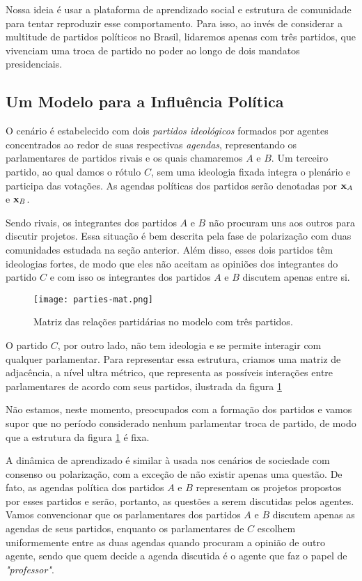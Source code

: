 Nossa ideia é usar a plataforma de aprendizado social e estrutura de comunidade para tentar reproduzir esse comportamento.
Para isso, ao invés de considerar a multitude de partidos políticos no Brasil, lidaremos apenas com três partidos, que vivenciam uma troca de partido no poder ao longo de dois mandatos presidenciais.

\subsection{Um Modelo para a Influência Política}

O cenário é estabelecido com dois \emph{partidos ideológicos} formados por agentes concentrados ao redor de suas respectivas \emph{agendas}, representando os parlamentares de partidos rivais e os quais chamaremos  $A$ e $B$.
Um terceiro partido, ao qual damos o rótulo $C$, sem uma ideologia fixada integra o plenário e participa das votações.
As agendas políticas dos partidos serão denotadas por $\mathbf{x}_A$ e $\mathbf{x}_B$.

Sendo rivais, os integrantes dos partidos $A$ e $B$ não procuram uns aos outros para discutir projetos.
Essa situação é bem descrita pela fase de polarização com duas comunidades estudada na seção anterior.
Além disso, esses dois partidos têm ideologias fortes, de modo que eles não aceitam as opiniões dos integrantes do partido $C$ e com isso os integrantes dos partidos $A$ e $B$ discutem apenas entre si.
\begin{figure}[t!]\label{fig:parties-mat}
    \centering
    \texttt{[image: parties-mat.png]}
    \caption{Matriz das relações partidárias no modelo com três partidos.}
\end{figure}
O partido $C$, por outro lado, não tem ideologia e se permite interagir com qualquer parlamentar.
Para representar essa estrutura, criamos uma matriz de adjacência, a nível ultra métrico, que representa as possíveis interações entre parlamentares de acordo com seus partidos, ilustrada da figura \ref{fig:parties-mat}

Não estamos, neste momento, preocupados com a formação dos partidos e vamos supor que no período considerado nenhum parlamentar troca de partido, de modo que a estrutura da figura \ref{fig:parties-mat} é fixa.

A dinâmica de aprendizado é similar à usada nos cenários de sociedade com consenso ou polarização, com a exceção de não existir apenas uma questão.
De fato, as agendas política dos partidos $A$ e $B$ representam os projetos propostos por esses partidos e serão, portanto, as questões a serem discutidas pelos agentes.
Vamos convencionar que os parlamentares dos partidos $A$ e $B$ discutem apenas as agendas de seus partidos, enquanto os parlamentares de $C$ escolhem uniformemente entre as duas agendas quando procuram a opinião de outro agente, sendo que quem decide a agenda discutida é o agente que faz o papel de \emph{"professor"}.

